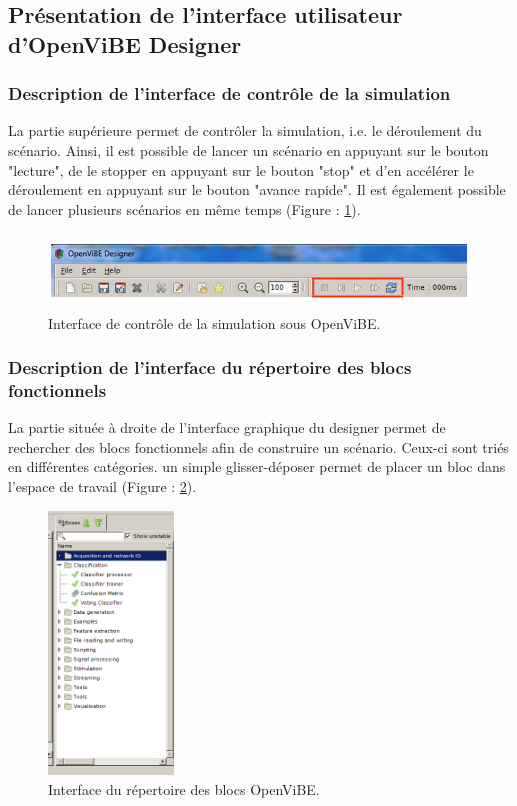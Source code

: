 \subsection*{Présentation de l'interface utilisateur d'OpenViBE Designer}

\subsubsection*{Description de l'interface de contrôle de la simulation}

La partie supérieure permet de contrôler la simulation, i.e. le déroulement du scénario. Ainsi, il est possible de lancer un scénario en appuyant sur le bouton "lecture", de le stopper en appuyant sur le bouton "stop" et d'en accélérer le déroulement en appuyant sur le bouton "avance rapide". Il est également possible de lancer plusieurs scénarios en même temps (Figure : \ref{fig:interface_simu_ov_1}). 

\begin{figure}[h]
	\centering\includegraphics[height=2cm]{images/interface_simu_ov.png}
	\caption{Interface de contrôle de la simulation sous OpenViBE.}
	\label{fig:interface_simu_ov_1}
\end{figure}

\subsubsection*{Description de l'interface du répertoire des blocs fonctionnels}

La partie située à droite de l'interface graphique du designer permet de rechercher des blocs fonctionnels afin de construire un scénario. Ceux-ci sont triés en différentes catégories. un simple glisser-déposer permet de placer un bloc dans l'espace de travail (Figure : \ref{fig:interface_bloc_ov_1}).

\begin{figure}[h]
	\centering\includegraphics[height=7cm]{images/interface_bloc_ov.png}
	\caption{Interface du répertoire des blocs OpenViBE.}
	\label{fig:interface_bloc_ov_1}
\end{figure}


